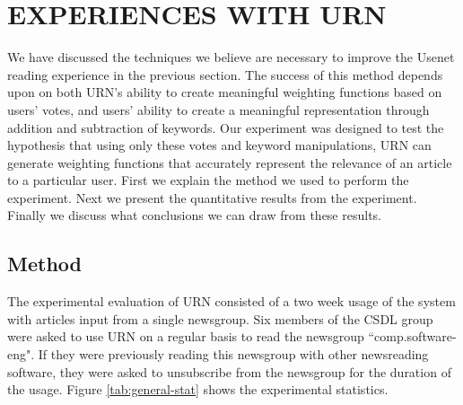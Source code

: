 
\section{EXPERIENCES WITH URN}



We have discussed the techniques we believe are necessary to improve the
Usenet reading experience in the previous section. The success of this
method depends upon on both URN's ability to create meaningful weighting
functions based on users' votes, and users' ability to create a meaningful
representation through addition and subtraction of keywords. Our experiment
was designed to test the hypothesis that using only these votes and keyword
manipulations, URN can generate weighting functions that accurately
represent the relevance of an article to a particular user. First we
explain the method we used to perform the experiment. Next we present the
quantitative results from the experiment.  Finally we discuss what
conclusions we can draw from these results.

\subsection{Method}

The experimental evaluation of URN consisted of a two week usage of the
system with articles input from a single newsgroup. Six members of the
CSDL group were asked to use URN on a regular basis to read the newsgroup
``comp.software-eng".  If they were previously reading this newsgroup with
other newsreading software, they were asked to unsubscribe from the
newsgroup for the duration of the usage. Figure \ref{tab:general-stat}
shows the experimental statistics.

